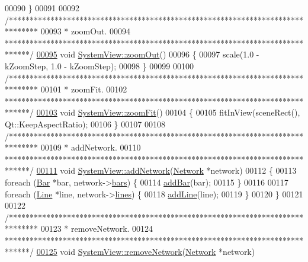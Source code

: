 \begin{DoxyCode}
00090 \}
00091 
00092 \textcolor{comment}{/*******************************************************************************}
00093 \textcolor{comment}{ * zoomOut.}
00094 \textcolor{comment}{ ******************************************************************************/}
\hypertarget{systemview_8cpp_source_l00095}{}\hyperlink{group___graphics_gaf971471c76265ec21cdde2aafe9b609f}{00095} \textcolor{keywordtype}{void} \hyperlink{group___graphics_gaf971471c76265ec21cdde2aafe9b609f}{SystemView::zoomOut}()
00096 \{
00097   scale(1.0 - kZoomStep, 1.0 - kZoomStep);
00098 \}
00099 
00100 \textcolor{comment}{/*******************************************************************************}
00101 \textcolor{comment}{ * zoomFit.}
00102 \textcolor{comment}{ ******************************************************************************/}
\hypertarget{systemview_8cpp_source_l00103}{}\hyperlink{group___graphics_gac1bf0b6a80216df74a8da1cb8ac5f0e8}{00103} \textcolor{keywordtype}{void} \hyperlink{group___graphics_gac1bf0b6a80216df74a8da1cb8ac5f0e8}{SystemView::zoomFit}()
00104 \{
00105   fitInView(sceneRect(), Qt::KeepAspectRatio);
00106 \}
00107 
00108 \textcolor{comment}{/*******************************************************************************}
00109 \textcolor{comment}{ * addNetwork.}
00110 \textcolor{comment}{ ******************************************************************************/}
\hypertarget{systemview_8cpp_source_l00111}{}\hyperlink{group___graphics_gae183447d0777c7b2b940a977f9b64c3f}{00111} \textcolor{keywordtype}{void} \hyperlink{group___graphics_gae183447d0777c7b2b940a977f9b64c3f}{SystemView::addNetwork}(\hyperlink{class_network}{Network} *network)
00112 \{
00113   \textcolor{keywordflow}{foreach} (\hyperlink{class_bar}{Bar} *bar, network->\hyperlink{class_network_ae37a8418e42adf765b143cdc9d992b6c}{bars}) \{
00114     \hyperlink{group___graphics_gac4e02019d41c203c788ff1e6f3ee460e}{addBar}(bar);
00115   \}
00116 
00117   \textcolor{keywordflow}{foreach} (\hyperlink{class_line}{Line} *line, network->\hyperlink{class_network_a49659f95d02baf087707c5a94fa23d90}{lines}) \{
00118     \hyperlink{group___graphics_gaed2fb15d518cab9a52ea1ee258846bfc}{addLine}(line);
00119   \}
00120 \}
00121 
00122 \textcolor{comment}{/*******************************************************************************}
00123 \textcolor{comment}{ * removeNetwork.}
00124 \textcolor{comment}{ ******************************************************************************/}
\hypertarget{systemview_8cpp_source_l00125}{}\hyperlink{group___graphics_ga2078ad08ff93b9a8683d567e3f9f714e}{00125} \textcolor{keywordtype}{void} \hyperlink{group___graphics_ga2078ad08ff93b9a8683d567e3f9f714e}{SystemView::removeNetwork}(\hyperlink{class_network}{Network} *network)

\end{DoxyCode}
